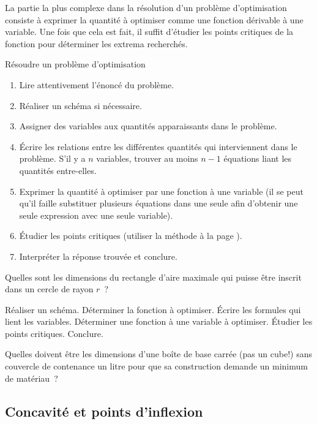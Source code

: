 \documentclass[a4paper,12pt]{article}
\begin{document}
La partie la plus complexe dans la résolution d'un problème d'optimisation consiste à exprimer la quantité à optimiser comme une fonction dérivable à une variable. Une fois que cela est fait, il suffit d'étudier les points critiques de la fonction pour déterminer les extrema recherchés. 
\begin{methode}
	Résoudre un problème d'optimisation
	\tcblower
	\begin{enumerate}
		\item Lire attentivement l'énoncé du problème.
		\item Réaliser un schéma si nécessaire.
		\item Assigner des variables aux quantités apparaissants dans le problème.
		\item Écrire les relations entre les différentes quantités qui interviennent dans le problème. S'il y a $n$ variables, trouver au moins $n-1$ équations liant les quantités entre-elles.
		\item Exprimer la quantité à optimiser par une fonction à une variable (il se peut qu'il faille substituer plusieurs équations dans une seule afin d'obtenir une seule expression avec une seule variable).
		\item Étudier les points critiques (utiliser la méthode à la page \pageref{met:ptcrit}).
		\item Interpréter la réponse trouvée et conclure.
	\end{enumerate}
\end{methode}

\begin{activite}
	Quelles sont les dimensions du rectangle d'aire maximale qui puisse être inscrit dans un cercle de rayon $r$~?
	\begin{tasks}
		\task Réaliser un schéma.
		\task Déterminer la fonction à optimiser.
		\task Écrire les formules qui lient les variables.
		\task Déterminer une fonction à une variable à optimiser.
		\task Étudier les points critiques.
		\task Conclure. 
	\end{tasks}
\end{activite}
\begin{activite}
	Quelles doivent être les dimensions d'une boîte de base carrée (pas un cube!) sans couvercle de contenance un litre pour que sa construction demande un minimum de matériau~?
\end{activite}
\subsection{Concavité et points d'inflexion}
\end{document}
